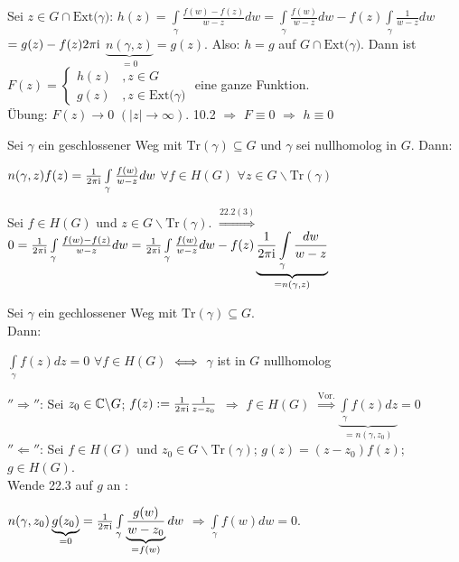 \documentclass[a4paper,twoside,DIV15,BCOR12mm]{scrbook}
\def\Tr{\text{Tr}}
\def\Ext{\text{Ext}(\ensuremath{\gamma)}}
\def\wegint{\ensuremath{\int\limits_\gamma}}
\def\ie{\rm i}
\begin{document}
\begin{beweis}
\begin{liste}
Sei $z \in G \cap \Ext$: $h(z) = \wegint \frac{f(w)-f(z)}{w-z} dw = \wegint
\frac{f(w)}{w-z} dw -  f(z) \wegint \frac{1}{w-z} dw$ $= g(z) - f(z) 2 \pi \ie$
$\underbrace{n(\gamma, z)}_{=0} = g(z)$. Also: $ h = g$ auf $G \cap \Ext$. Dann
ist \\
$F(z) = \begin{cases}
  h(z) &, z \in G \\
        g(z)&, z \in \Ext
	\end{cases}
$
eine ganze Funktion.\\ Übung: $F(z) \to 0$ $(|z| \to \infty)$. 10.2 $\Rightarrow$
$F \equiv 0$ $\Rightarrow$ $h \equiv 0$
\end{liste}
\end{beweis}

\begin{satz} 
Sei $\gamma$ ein geschlossener Weg mit $\Tr(\gamma) \subseteq G$  und $\gamma$
sei nullhomolog in $G$. Dann:
\\  
\centerline{ $n(\gamma,z) f(z) = \frac{1}{2 \pi \ie} \wegint \frac{f(w)}{w-z}
dw$ $\forall f \in H(G)$ $\forall z \in G \backslash \Tr(\gamma)$ }
\end{satz}
\begin{beweis}
Sei $f \in H(G)$ und $z \in G \backslash \Tr(\gamma)$.
$\stackrel{22.2(3)}{\Rightarrow} $ $0 = \frac{1}{2 \pi \ie} \wegint
\frac{f(w)-f(z)}{w-z} dw = \frac{1}{2 \pi \ie} \wegint \frac{f(w)}{w-z} dw -
f(z)  \underbrace{\frac{1}{2 \pi \ie} \wegint \frac{dw}{w-z}}_{=n(\gamma,z)}$
\end{beweis}
\begin{satz} 
Sei $\gamma$ ein gechlossener Weg mit $\Tr(\gamma) \subseteq G$.\\ Dann: \\ 
\centerline{$\wegint f(z) dz = 0$ $\forall f \in H(G)$ $\iff$ $\gamma$ ist in
$G$ nullhomolog}
\end{satz}
\begin{beweis}
$''\Rightarrow''$: Sei $z_0 \in \mathbb{C} \backslash G$; $f(z) := \frac{1}{2 \pi \ie}
\frac{1}{z-z_0} $ $\Rightarrow$ $f \in H(G)$
$\stackrel{\text{Vor.}}{\Rightarrow} \underbrace{\wegint f(z) dz}_{= n(\gamma, z_0
)} = 0$ \\
$''\Leftarrow''$: Sei $f \in H(G)$ und $z_0 \in G \backslash \Tr(\gamma)$;
$g(z) = (z-z_0)f(z)$; $g \in H(G)$. \\ Wende 22.3 auf $g$ an : \\
\centerline{$n(\gamma,z_0) \underbrace{g(z_0)}_{=0} = \frac{1}{2 \pi \ie} \wegint
\underbrace{\frac{g(w)}{w-z_0}}_{=f(w)} dw$ $\Rightarrow \wegint f(w) dw = 0.$} 
\end{beweis}
\end{document}
